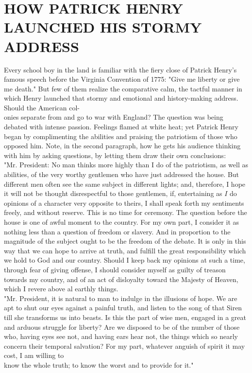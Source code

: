\documentclass[10pt]{article}
\begin{document}
\section*{HOW PATRICK HENRY LAUNCHED HIS STORMY ADDRESS}
Every school boy in the land is familiar with the fiery close of Patrick Henry's famous speech before the Virginia Convention of 1775: "Give me liberty or give me death." But few of them realize the comparative calm, the tactful manner in which Henry launched that stormy and emotional and history-making address. Should the American col-\\
onies separate from and go to war with England? The question was being debated with intense passion. Feelings flamed at white heat; yet Patrick Henry began by complimenting the abilities and praising the patriotism of those who opposed him. Note, in the second paragraph, how he gets his audience thinking with him by asking questions, by letting them draw their own conclusions:\\
"Mr. President: No man thinks more highly than I do of the patriotism, as well as abilities, of the very worthy gentlemen who have just addressed the house. But different men often see the same subject in different lights; and, therefore, I hope it will not be thought disrespectful to those gentlemen, if, entertaining as $I$ do opinions of a character very opposite to theirs, I shall speak forth my sentiments freely, and without reserve. This is no time for ceremony. The question before the house is one of awful moment to the country. For my own part, I consider it as nothing less than a question of freedom or slavery. And in proportion to the magnitude of the subject ought to be the freedom of the debate. It is only in this way that we can hope to arrive at truth, and fulfill the great responsibility which we hold to God and our country. Should I keep back my opinions at such a time, through fear of giving offense, I should consider myself as guilty of treason towards my country, and of an act of disloyalty toward the Majesty of Heaven, which I revere above al earthly things.\\
"Mr. President, it is natural to man to indulge in the illusions of hope. We are apt to shut our eyes against a painful truth, and listen to the song of that Siren till she transforms us into beasts. Is this the part of wise men, engaged in a great and arduous struggle for liberty? Are we disposed to be of the number of those who, having eyes see not, and having ears hear not, the things which so nearly concern their temporal salvation? For my part, whatever anguish of spirit it may cost, I am willing to\\
know the whole truth; to know the worst and to provide for it."
\end{document}
